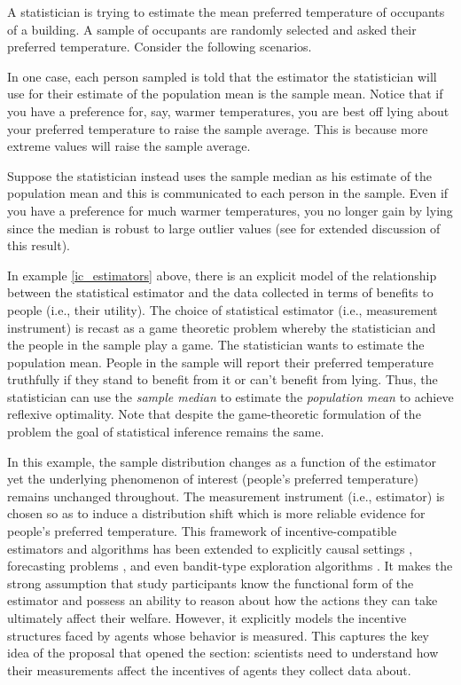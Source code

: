 \begin{example}\label{ic_estimators}
A statistician is trying to estimate the mean preferred temperature of occupants of a building. A sample of occupants are randomly selected and asked their preferred temperature. Consider the following scenarios.

In one case, each person sampled is told that the estimator the statistician will use for their estimate of the population mean is the sample mean. Notice that if you have a preference for, say, warmer temperatures, you are best off lying about your preferred temperature to raise the sample average. This is because more extreme values will raise the sample average.

Suppose the statistician instead uses the sample median as his estimate of the population mean and this is communicated to each person in the sample. Even if you have a preference for much warmer temperatures, you no longer gain by lying since the median is robust to large outlier values (see \cite{caragiannis2016} for extended discussion of this result).
\end{example}

In example \ref{ic_estimators} above, there is an explicit model of the relationship between the statistical estimator and the data collected in terms of benefits to people (i.e., their utility). The choice of statistical estimator (i.e., measurement instrument) is recast as a game theoretic problem whereby the statistician and the people in the sample play a game. The statistician wants to estimate the population mean. People in the sample will report their preferred temperature truthfully if they stand to benefit from it or can't benefit from lying. Thus, the statistician can use the \textit{sample median} to estimate the \textit{population mean} to achieve reflexive optimality. Note that despite the game-theoretic formulation of the problem the goal of statistical inference remains the same.

In this example, the sample distribution changes as a function of the estimator yet the underlying phenomenon of interest (people's preferred temperature) remains unchanged throughout. The measurement instrument (i.e., estimator) is chosen so as to induce a distribution shift which is more reliable evidence for people's preferred temperature. This framework of incentive-compatible estimators and algorithms has been extended to explicitly causal settings \autocite{toulis2015}, forecasting problems \autocite{roughgarden2017}, and even bandit-type exploration algorithms \autocite{mansour2019}. It makes the strong assumption that study participants know the functional form of the estimator and possess an ability to reason about how the actions they can take ultimately affect their welfare. However, it explicitly models the incentive structures faced by agents whose behavior is measured. This captures the key idea of the proposal that opened the section: scientists need to understand how their measurements affect the incentives of agents they collect data about.





